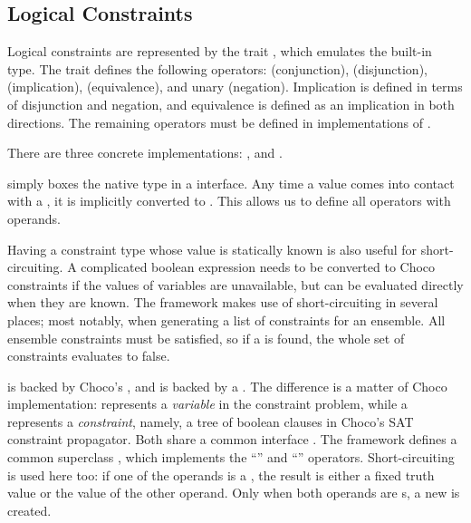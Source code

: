 
\subsection{Logical Constraints}

Logical constraints are represented by the trait , which emulates the
built-in  type. The trait defines the following operators: \dop{&&}
(conjunction), \dop{||} (disjunction), \dop{->} (implication), \dop{<->} (equivalence),
and unary \dop{!} (negation). Implication is defined in terms of disjunction and
negation, and equivalence is defined as an implication in both directions. The remaining
operators must be defined in implementations of .

There are three concrete implementations: ,  and
.

\medskip

 simply boxes the native  type in a 
interface. Any time a  value comes into contact with a , it is
implicitly converted to . This allows us to define all operators with
 operands.

Having a constraint type whose value is statically known is also useful for
short-circuiting. A complicated boolean expression needs to be converted to Choco
constraints if the values of variables are unavailable, but can be evaluated directly
when they are known. The framework makes use of short-circuiting in several places; most
notably, when generating a list of constraints for an ensemble. All ensemble constraints
must be satisfied, so if a  is found, the whole set of
constraints evaluates to false.

\medskip

 is backed by Choco's , and  is backed
by a . The difference is a matter of Choco implementation: 
represents a \textit{variable} in the constraint problem, while a  represents
a \textit{constraint}, namely, a tree of boolean clauses in Choco's SAT constraint
propagator. Both share a common interface . The framework defines a common
superclass , which implements the ``\cc{&&}'' and ``\cc{||}''
operators. Short-circuiting is used here too: if one of the operands is a
, the result is either a fixed truth value or the value of the other
operand. Only when both operands are s, a new  is
created.

